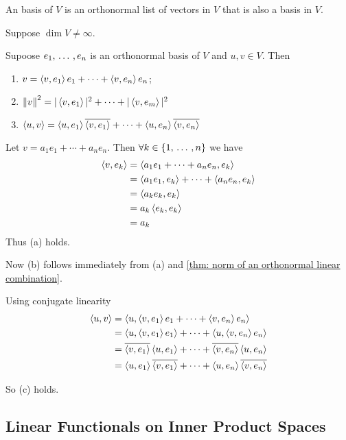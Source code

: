 \begin{mydef}
  An  basis of $V$ is an orthonormal list of vectors in $V$ that is also a basis in $V$.
\end{mydef}

\begin{mydef}
  Suppose $\dim V \neq \infty$.
\end{mydef}

\begin{thm}
  Supoose $e_1, \ddd, e_n$ is an orthonormal basis of $V$ and $u,v \in V$. Then
  \begin{enumerate}[label=(\alph*)]
    \item $v=\ip{v}{e_1}e_1 + \cdots + \ip{v}{e_n}e_n$;
    \item $\norm{v}^2 = |\ip{v}{e_1}|^2 + \cdots + |\ip{v}{e_m}|^2$
    \item $\ip{u}{v} = \ip{u}{e_1} \overline{\ip{v}{e_1}} + \cdots + \ip{u}{e_n} \overline{\ip{v}{e_n}}$
  \end{enumerate}
\end{thm}
\begin{prf}
  Let $v=a_1 e_1 + \cdots + a_n e_n$. Then $\forall k \in \{1, \ddd, n\}$ we have
  \begin{equation}
    \begin{aligned}
      \ip{v}{e_k}
      &=\ip{a_1 e_1 + \cdots + a_n e_n}{e_k} \\
      &=\ip{a_1 e_1}{e_k} + \cdots + \ip{a_n e_n}{e_k}\\
      &=\ip{a_ke_k}{e_k} \\
      &= a_k\ip{e_k}{e_k} \\
      &=a_k
    \end{aligned}
  \end{equation}
  Thus (a) holds.

  Now (b) follows immediately from (a) and \ref{thm: norm of an orthonormal linear combination}.

  Using conjugate linearity
  \begin{equation}
    \begin{aligned}
      \ip{u}{v}
      &=\ip{u}{\ip{v}{e_1}e_1 + \cdots + \ip{v}{e_n}e_n} \\
      &= \ip{u}{\ip{v}{e_1}e_1} + \cdots + \ip{u}{\ip{v}{e_n}e_n} \\
      &= \overline{\ip{v}{e_1}}\ip{u}{e_1} + \cdots + \overline{\ip{v}{e_n}}\ip{u}{e_n} \\
      &= \ip{u}{e_1}\overline{\ip{v}{e_1}} + \cdots + \ip{u}{e_n}\overline{\ip{v}{e_n}}
    \end{aligned}
  \end{equation}

  So (c) holds.
\end{prf}

\subsection{Linear Functionals on Inner Product Spaces}